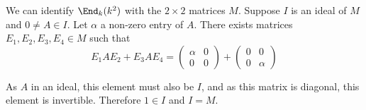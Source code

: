 We can identify $\End_k(k^2)$ with the $2\times 2$ matrices $M$. Suppose $I$ is an ideal of $M$ and $0 \neq A \in I$. Let $\alpha$ a non-zero entry of $A$. There exists matrices $E_1,E_2,E_3,E_4 \in M$ such that 
\[E_1 A E_2  + E_3AE_4 =
\begin{pmatrix}
\alpha  & 0\\ 
 0& 0
\end{pmatrix} +
\begin{pmatrix}
0& 0\\ 
 0& \alpha
\end{pmatrix}
\]

As $A$ in an ideal, this element must also be $I$, and as this matrix is diagonal, this element is invertible. Therefore $1\in I$ and $I=M$. 